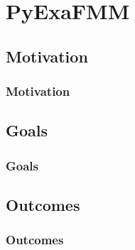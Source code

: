 \section{PyExaFMM}

\subsection{Motivation}
\begin{frame}
    \frametitle{Motivation}
    \cite{Greengard:1987:JCP}
\end{frame}

\subsection{Goals}
\begin{frame}
    \frametitle{Goals}
\end{frame}

\subsection{Outcomes}
\begin{frame}
    \frametitle{Outcomes}
\end{frame}
